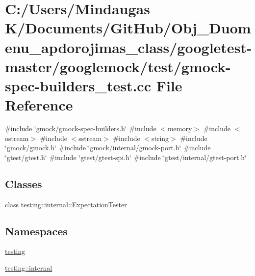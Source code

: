 \hypertarget{googletest-master_2googlemock_2test_2gmock-spec-builders__test_8cc}{}\section{C\+:/\+Users/\+Mindaugas K/\+Documents/\+Git\+Hub/\+Obj\+\_\+\+Duomenu\+\_\+apdorojimas\+\_\+class/googletest-\/master/googlemock/test/gmock-\/spec-\/builders\+\_\+test.cc File Reference}
\label{googletest-master_2googlemock_2test_2gmock-spec-builders__test_8cc}
{\ttfamily \#include \char`\"{}gmock/gmock-\/spec-\/builders.\+h\char`\"{}}\newline
{\ttfamily \#include $<$memory$>$}\newline
{\ttfamily \#include $<$ostream$>$}\newline
{\ttfamily \#include $<$sstream$>$}\newline
{\ttfamily \#include $<$string$>$}\newline
{\ttfamily \#include \char`\"{}gmock/gmock.\+h\char`\"{}}\newline
{\ttfamily \#include \char`\"{}gmock/internal/gmock-\/port.\+h\char`\"{}}\newline
{\ttfamily \#include \char`\"{}gtest/gtest.\+h\char`\"{}}\newline
{\ttfamily \#include \char`\"{}gtest/gtest-\/spi.\+h\char`\"{}}\newline
{\ttfamily \#include \char`\"{}gtest/internal/gtest-\/port.\+h\char`\"{}}\newline
\subsection*{Classes}
\begin{DoxyCompactItemize}
\item 
class \mbox{\hyperlink{classtesting_1_1internal_1_1_expectation_tester}{testing\+::internal\+::\+Expectation\+Tester}}
\end{DoxyCompactItemize}
\subsection*{Namespaces}
\begin{DoxyCompactItemize}
\item 
 \mbox{\hyperlink{namespacetesting}{testing}}
\item 
 \mbox{\hyperlink{namespacetesting_1_1internal}{testing\+::internal}}
\end{DoxyCompactItemize}
